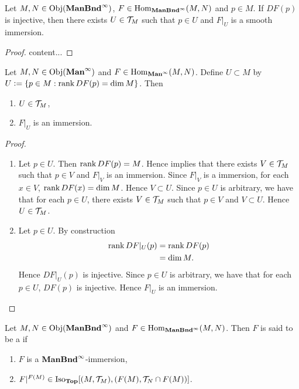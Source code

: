 \documentclass{book}
\begin{document}
	\begin{ex} 
		Let $M, N \in \operatorname{Obj}(\operatorname*{\text{\textbf{ManBnd}}^{\infty}})$, $F \in \operatorname{Hom}_{\operatorname*{\text{\textbf{ManBnd}}^{\infty}}}(M, N)$ and $p \in M$. If $DF(p)$ is injective, then there exists $U \in \mathcal{T}_M$ such that $p \in U$ and $F|_U$ is a smooth immersion.
	\end{ex}

	\begin{proof}
		content...
	\end{proof}

	\begin{ex} 
		Let $M, N \in \operatorname{Obj}(\operatorname*{\text{\textbf{Man}}^{\infty}})$ and $F \in \operatorname{Hom}_{\operatorname*{\text{\textbf{Man}}^{\infty}}}(M,N)$. Define $U \subset M$ by $U \vcentcolon= \{p \in M: \operatorname{\text{rank}} DF(p) = \dim M\}$. Then 
		\begin{enumerate}
			\item $U \in \mathcal{T}_M$,
			\item $F|_U$ is an immersion.
		\end{enumerate}
	\end{ex}
	
	\begin{proof}\
		\begin{enumerate}
			\item Let $p \in U$. Then $\operatorname{\text{rank}} DF(p) = M$. Hence  implies that there exists $V \in \mathcal{T}_M$ such that $p \in V$ and $F|_V$ is an immersion. Since $F|_V$ is a immersion, for each $x \in V$, $\operatorname{\text{rank}} DF(x) = \dim M$. Hence $V \subset U$. Since $p \in U$ is arbitrary, we have that for each $p \in U$, there exists $V \in \mathcal{T}_M$ such that $p \in V$ and $V \subset U$. Hence $U \in \mathcal{T}_M$.
			\item Let $p \in U$. By construction  
			\begin{align*}
				\operatorname{\text{rank}} DF|_U(p)
				& = \operatorname{\text{rank}} DF(p) \\ 
				& = \dim M.
			\end{align*}
			Hence $DF|_U(p)$ is injective. Since $p \in U$ is arbitrary, we have that for each $p \in U$, $DF(p)$ is injective. Hence $F|_U$ is an immersion.
		\end{enumerate}
	\end{proof}
	
	\begin{defn}  
		Let $M, N \in \operatorname{Obj}(\operatorname*{\text{\textbf{ManBnd}}^{\infty}})$ and $F \in \operatorname{Hom}_{\operatorname*{\text{\textbf{ManBnd}}^{\infty}}}(M, N)$. Then $F$ is said to be a  if 
		\begin{enumerate}
			\item $F$ is a $\operatorname*{\text{\textbf{ManBnd}}^{\infty}}$-immersion, 
			\item $F|^{F(M)} \in \operatorname{Iso}_{\operatorname*{\text{\textbf{Top}}}}[(M, \mathcal{T}_M), (F(M), \mathcal{T}_N \cap F(M))]$.
		\end{enumerate}	 
	\end{defn}	
\end{document}
